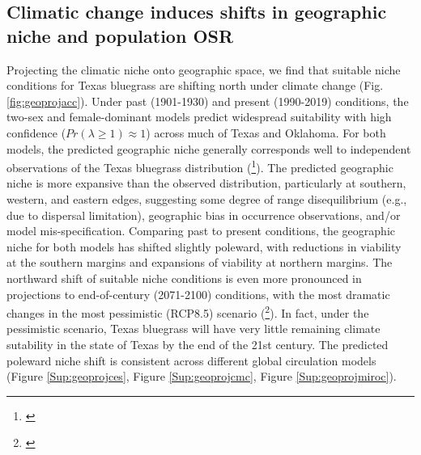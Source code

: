 \documentclass[12pt]{article}\usepackage[]{graphicx}\usepackage[dvipsnames]{xcolor}
\newcommand{\tom}[2]{{\color{red}{#1}}\footnote{\textit{\color{red}{#2}}}}
\begin{document}
\subsection*{Climatic change induces shifts in geographic niche and population OSR}
Projecting the climatic niche onto geographic space, we find that suitable niche conditions for Texas bluegrass are shifting north under climate change (Fig. \ref{fig:geoprojacc}). 
Under past (1901-1930) and present (1990-2019) conditions, the two-sex and female-dominant models predict widespread suitability with high confidence ($Pr(\lambda \ge 1) \approx 1$) across much of Texas and Oklahoma. 
For both models, the predicted geographic niche generally corresponds well to independent observations of the Texas bluegrass distribution (\tom{Fig.}{I think we should add the GBIF records to the map.}).
The predicted geographic niche is more expansive than the observed distribution, particularly at southern, western, and eastern edges, suggesting some degree of range disequilibrium (e.g., due to dispersal limitation), geographic bias in occurrence observations, and/or model mis-specification. 
Comparing past to present conditions, the geographic niche for both models has shifted slightly poleward, with reductions in viability at the southern margins and expansions of viability at northern margins. 
The northward shift of suitable niche conditions is even more pronounced in projections to end-of-century (2071-2100) conditions, with the most dramatic changes in the most pessimistic (RCP8.5) scenario (\tom{Fig.}{Here and throughout, we need to reference specific figure panels by letter label.}). 
In fact, under the pessimistic scenario, Texas bluegrass will have very little remaining climate sutability in the state of Texas by the end of the 21st century. 
The predicted poleward niche shift is consistent across different global circulation models (Figure \ref{Sup:geoprojces}, Figure \ref{Sup:geoprojcmc}, Figure \ref{Sup:geoprojmiroc}). 
\end{document}
